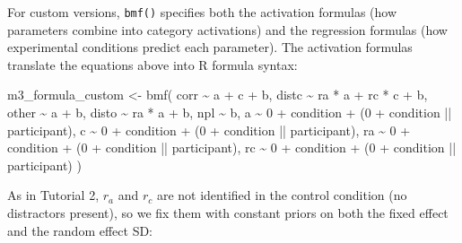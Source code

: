 \documentclass[
  man,
  floatsintext,
  longtable,
  nolmodern,
  notxfonts,
  notimes,
  colorlinks=true,linkcolor=blue,citecolor=blue,urlcolor=blue]{apa7}
\newenvironment{Shaded}{\begin{snugshade}}{\end{snugshade}}
\newcommand{\DecValTok}[1]{\textcolor[rgb]{0.68,0.00,0.00}{#1}}
\newcommand{\FunctionTok}[1]{\textcolor[rgb]{0.28,0.35,0.67}{#1}}
\newcommand{\NormalTok}[1]{\textcolor[rgb]{0.00,0.23,0.31}{#1}}
\newcommand{\OtherTok}[1]{\textcolor[rgb]{0.00,0.23,0.31}{#1}}
\newcommand{\SpecialCharTok}[1]{\textcolor[rgb]{0.37,0.37,0.37}{#1}}
\begin{document}
For custom versions, \texttt{bmf()} specifies both the activation
formulas (how parameters combine into category activations) and the
regression formulas (how experimental conditions predict each
parameter). The activation formulas translate the equations above into R
formula syntax:

\begin{Shaded}
\begin{Highlighting}[]
\NormalTok{m3\_formula\_custom }\OtherTok{\textless{}{-}} \FunctionTok{bmf}\NormalTok{(}
\NormalTok{  corr  }\SpecialCharTok{\textasciitilde{}}\NormalTok{ a }\SpecialCharTok{+}\NormalTok{ c }\SpecialCharTok{+}\NormalTok{ b,}
\NormalTok{  distc }\SpecialCharTok{\textasciitilde{}}\NormalTok{ ra }\SpecialCharTok{*}\NormalTok{ a }\SpecialCharTok{+}\NormalTok{ rc }\SpecialCharTok{*}\NormalTok{ c }\SpecialCharTok{+}\NormalTok{ b,}
\NormalTok{  other }\SpecialCharTok{\textasciitilde{}}\NormalTok{ a }\SpecialCharTok{+}\NormalTok{ b,}
\NormalTok{  disto }\SpecialCharTok{\textasciitilde{}}\NormalTok{ ra }\SpecialCharTok{*}\NormalTok{ a }\SpecialCharTok{+}\NormalTok{ b,}
\NormalTok{  npl   }\SpecialCharTok{\textasciitilde{}}\NormalTok{ b,}
\NormalTok{  a  }\SpecialCharTok{\textasciitilde{}} \DecValTok{0} \SpecialCharTok{+}\NormalTok{ condition }\SpecialCharTok{+}\NormalTok{ (}\DecValTok{0} \SpecialCharTok{+}\NormalTok{ condition }\SpecialCharTok{||}\NormalTok{ participant),}
\NormalTok{  c  }\SpecialCharTok{\textasciitilde{}} \DecValTok{0} \SpecialCharTok{+}\NormalTok{ condition }\SpecialCharTok{+}\NormalTok{ (}\DecValTok{0} \SpecialCharTok{+}\NormalTok{ condition }\SpecialCharTok{||}\NormalTok{ participant),}
\NormalTok{  ra }\SpecialCharTok{\textasciitilde{}} \DecValTok{0} \SpecialCharTok{+}\NormalTok{ condition }\SpecialCharTok{+}\NormalTok{ (}\DecValTok{0} \SpecialCharTok{+}\NormalTok{ condition }\SpecialCharTok{||}\NormalTok{ participant),}
\NormalTok{  rc }\SpecialCharTok{\textasciitilde{}} \DecValTok{0} \SpecialCharTok{+}\NormalTok{ condition }\SpecialCharTok{+}\NormalTok{ (}\DecValTok{0} \SpecialCharTok{+}\NormalTok{ condition }\SpecialCharTok{||}\NormalTok{ participant)}
\NormalTok{)}
\end{Highlighting}
\end{Shaded}

As in Tutorial 2, \(r_a\) and \(r_c\) are not identified in the control
condition (no distractors present), so we fix them with constant priors
on both the fixed effect and the random effect SD:
\end{document}
